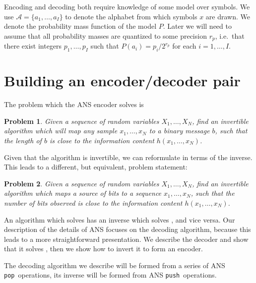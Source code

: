 \documentclass{article}
\newtheorem{problem}{Problem}
\newcommand{\push}{\texttt{push}}
\newcommand{\pop}{\texttt{pop}}
\begin{document}
Encoding and decoding both require knowledge of some model over symbols. We use
\(\mathcal{A} = \{a_1, \ldots, a_I\}\) to denote the alphabet from which
symbols \(x\) are drawn. We denote the probability mass function of the model
\(P\). Later we will need to assume that all probability masses are quantized
to some precision \(r_p\), i.e.\ that there exist integers \(p_1, \ldots, p_I\)
such that
\(P(a_i) = {p_i}/{2^{r_p}}\) for each \(i = 1,\ldots,I\).

\section{Building an encoder/decoder pair}
The problem which the ANS encoder solves is

\begin{problem}\label{prob:default}
  Given a sequence of random variables \(X_1, \ldots, X_N\), find an invertible
  algorithm which will map any sample \(x_1, \ldots, x_N\) to a binary message
  \(b\), such that the length of \(b\) is close to the information content
  \(h(x_1, \ldots, x_N)\).
\end{problem}

Given that the algorithm is invertible, we can reformulate 
in terms of the inverse. This leads to a different, but equivalent, problem
statement:

\begin{problem}\label{prob:alt}
  Given a sequence of random variables \(X_1, \ldots, X_N\), find an invertible
  algorithm which maps a source of bits to a sequence \(x_1, \ldots, x_N\),
  such that the number of bits observed is close to the information content
  \(h(x_1, \ldots, x_N)\).
\end{problem}

An algorithm which solves  has an inverse which solves
, and vice versa. Our description of the details of ANS
focuses on the decoding algorithm, because this leads to a more straightforward
presentation. We describe the decoder and show that it solves ,
then we show how to invert it to form an encoder.

The decoding algorithm we describe will be formed from a series of ANS \pop\
operations, its inverse will be formed from ANS \push\ operations.
\end{document}
